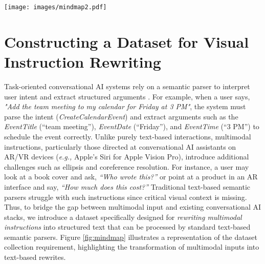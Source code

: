 \begin{figure*}[t]
  \centering
  \texttt{[image: images/mindmap2.pdf]} 
  \caption{Mindmap showing Data Collection and Rewrite Desiderata}
  \label{fig:mindmap}
\end{figure*}
\section{Constructing a Dataset for Visual Instruction Rewriting}
\label{sec:datasets}

Task-oriented conversational AI systems rely on a semantic parser to interpret user intent and extract structured arguments \cite{louvan2020recent,aghajanyan2020conversational}. For example, when a user says,\textit{ "Add the team meeting to my calendar for Friday at 3 PM"}, the system must parse the intent (\textit{CreateCalendarEvent}) and extract arguments such as the \textit{EventTitle} (``team meeting''), \textit{EventDate} (``Friday''), and \textit{EventTime} (``3 PM'') to schedule the event correctly. Unlike purely text-based interactions, multimodal instructions, particularly those directed at conversational AI assistants on AR/VR devices (\textit{e.g.,} Apple's Siri for Apple Vision Pro), introduce additional challenges such as ellipsis and coreference resolution. For instance, a user may look at a book cover and ask, \textit{“Who wrote this?”} or point at a product in an AR interface and say, \textit{“How much does this cost?”} Traditional text-based semantic parsers struggle with such instructions since critical visual context is missing. Thus, to bridge the gap between multimodal input and existing conversational AI stacks, we introduce a dataset specifically designed for \textit{rewriting multimodal instructions} into structured text that can be processed by standard text-based semantic parsers. Figure \ref{fig:mindmap} illustrates a representation of the dataset collection requirement, highlighting the transformation of multimodal inputs into text-based rewrites.

